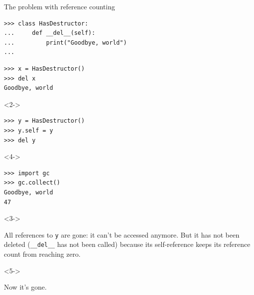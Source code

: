 \documentclass[aspectratio=169]{beamer}
\begin{document}
\begin{frame}[fragile]{The problem with reference counting}
\vspace{0.4 cm}
\small
\begin{verbatim}
>>> class HasDestructor:
...     def __del__(self):
...         print("Goodbye, world")
... 
\end{verbatim}
\vspace{0.1 cm}
\begin{verbatim}
>>> x = HasDestructor()
>>> del x
Goodbye, world
\end{verbatim}

\begin{uncoverenv}<2->
\vspace{0.1 cm}
\begin{verbatim}
>>> y = HasDestructor()
>>> y.self = y
>>> del y
\end{verbatim}
\end{uncoverenv}

\begin{uncoverenv}<4->
\vspace{0.1 cm}
\begin{verbatim}
>>> import gc
>>> gc.collect()
Goodbye, world
47
\end{verbatim}
\end{uncoverenv}

\begin{uncoverenv}<3->
\vspace{-3.5 cm}
\hfill \begin{minipage}{7.75 cm} All references to \texttt{y} are gone: it can't be accessed anymore. But it has not been deleted (\texttt{__del__} has not been called) because its self-reference keeps its reference count from reaching zero.\end{minipage}
\vspace{3.5 cm}
\end{uncoverenv}

\begin{uncoverenv}<5->
\vspace{-2.7 cm}
\hfill \begin{minipage}{7.75 cm} Now it's gone.\end{minipage}
\vspace{2.7 cm}
\end{uncoverenv}
\end{frame}
\end{document}
